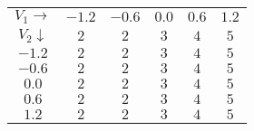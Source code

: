 \documentclass[12pt,twoside, a4paper, twocolumn]{article}
\begin{document}
\begin{center}
    \begin{tabular}{ |cccccc| }
        \hline
        $V_1 \rightarrow$ & $-1.2$ & $-0.6$ & $0.0$ & $0.6$ & $1.2$ \\
        $ V_2 \downarrow$ & $2$    & $2$    & $3$   & $4$   & $5$   \\
        $-1.2$            & $2$    & $2$    & $3$   & $4$   & $5$   \\
        $ -0.6$           & $2$    & $2$    & $3$   & $4$   & $5$   \\
        $0.0$             & $2$    & $2$    & $3$   & $4$   & $5$   \\
        $ 0.6$            & $2$    & $2$    & $3$   & $4$   & $5$   \\
        $ 1.2$            & $2$    & $2$    & $3$   & $4$   & $5$   \\
        \hline
    \end{tabular}
\end{center}
\end{document}
